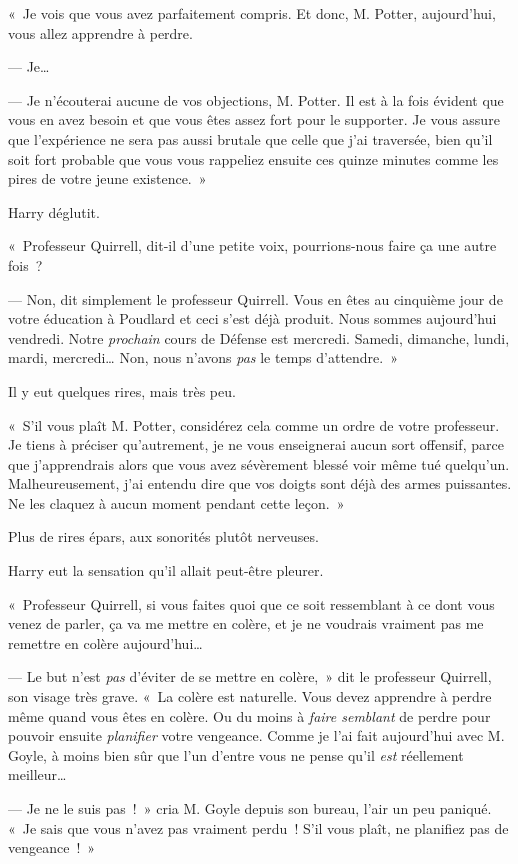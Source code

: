 «~Je vois que vous avez parfaitement compris.
Et donc, M. Potter, aujourd'hui, vous allez apprendre à perdre.

--- Je…

--- Je n'écouterai aucune de vos objections, M. Potter.
Il est à la fois évident que vous en avez besoin et que vous êtes assez fort pour le supporter.
Je vous assure que l'expérience ne sera pas aussi brutale que celle que j'ai traversée, bien qu'il soit fort probable que vous vous rappeliez ensuite ces quinze minutes comme les pires de votre jeune existence.~»

Harry déglutit.

«~Professeur Quirrell, dit-il d'une petite voix, pourrions-nous faire ça une autre fois~?

--- Non, dit simplement le professeur Quirrell.
Vous en êtes au cinquième jour de votre éducation à Poudlard et ceci s'est déjà produit.
Nous sommes aujourd'hui vendredi.
Notre \emph{prochain} cours de Défense est mercredi.
Samedi, dimanche, lundi, mardi, mercredi…
Non, nous n'avons \emph{pas} le temps d'attendre.~»

Il y eut quelques rires, mais très peu.

«~S'il vous plaît M. Potter, considérez cela comme un ordre de votre professeur.
Je tiens à préciser qu'autrement, je ne vous enseignerai aucun sort offensif, parce que j'apprendrais alors que vous avez sévèrement blessé voir même tué quelqu'un.
Malheureusement, j'ai entendu dire que vos doigts sont déjà des armes puissantes.
Ne les claquez à aucun moment pendant cette leçon.~»

Plus de rires épars, aux sonorités plutôt nerveuses.

Harry eut la sensation qu'il allait peut-être pleurer.

«~Professeur Quirrell, si vous faites quoi que ce soit ressemblant à ce dont vous venez de parler, ça va me mettre en colère, et je ne voudrais vraiment pas me remettre en colère aujourd'hui…

--- Le but n'est \emph{pas} d'éviter de se mettre en colère,~» dit le professeur Quirrell, son visage très grave.
«~La colère est naturelle.
Vous devez apprendre à perdre même quand vous êtes en colère.
Ou du moins à \emph{faire semblant} de perdre pour pouvoir ensuite \emph{planifier} votre vengeance.
Comme je l'ai fait aujourd'hui avec M. Goyle, à moins bien sûr que l'un d'entre vous ne pense qu'il \emph{est} réellement meilleur…

--- Je ne le suis pas~!~»
cria M. Goyle depuis son bureau, l'air un peu paniqué.
«~Je sais que vous n'avez pas vraiment perdu~!
S'il vous plaît, ne planifiez pas de vengeance~!~»


